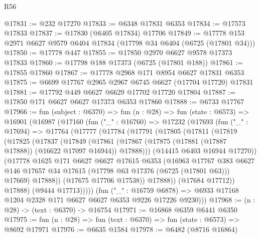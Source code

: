 \begin{lexlean}{R56}
\begin{coremodule}
@17831 := @232 @17270
@17833 := @6348 @17831 @6353
@17834 := @17573 @17833
@17837 := @17830 (@6405 @17834) @17706
@17849 := @17778 @153 @2971 @6627 @9579 @6404 @17834 (@17798 @34 @6404 (@6725 (@17801 @34)))
@17850 := @17778 @447
@17855 := @17850 @2970 @6627 @9578 @17373 @17833
@17860 := @17798 @188 @17373 (@6725 (@17801 @188))
@17861 := @17855 @17860
@17867 := @17778 @2968 @171 @8954 @6627 @17831 @6353
@17875 := @6699 @17767 @2965 @2967 @6745 @6627 (@17704 @17720) @17831
@17881 := @17792 @449 @6627 @6629 @17702 @17720 @17804
@17887 := @17850 @171 @6627 @6627 @17373 @6353 @17860
@17888 := @6733 @17767
@17966 := fun (subject : @6370) =>
  fun (n : @28) =>
  fun (state : @6573) =>
  @16901
    (@16987
      (@17160
        (fun ("_" : @16760) =>
        @17232
          (@17693
            (fun ("_" : @17694) =>
            @17764
              (@17777
                (@17784
                  (@17791
                    (@17805
                      (@17811
                        (@17819
                          (@17825
                            (@17837
                              (@17849
                                (@17861
                                  (@17867
                                    (@17875 (@17881 (@17887 @17888)) (@16622 @17097 @16944))
                                    @17888)))
                              (@14415 @6403 @16944 @17270))
                            (@17778
                              @1625
                              @171
                              @6627
                              @6627
                              @17615
                              @6353
                              (@16963
                                @17767
                                @383
                                @6627
                                @146
                                @17657
                                @34
                                @17615
                                (@17798 @63 @17376 (@6725 (@17801 @63)))
                                @17669)
                              @17888))
                          (@17675 @17706 @17538))
                        @17888))
                    (@17684 @17712))
                  @17888)
                (@9444 @17713)))))
        (fun ("_" : @16759 @6878) =>
        @6933 @17168 @1204 @2328 @171 @6627 @6627 @6353 @9226 @17226 @9230)))
@17968 := (n : @28) -> (text : @6370) -> @16754
@17971 := @16868 @6359 @6441 @6350
@17975 := fun (n : @28) => fun (text : @6370) => fun (state : @6573) => @8692 @17971
@17976 := @6635 @1584
@17978 := @6482 (@8716 @16864)

\end{coremodule}
\end{lexlean}
